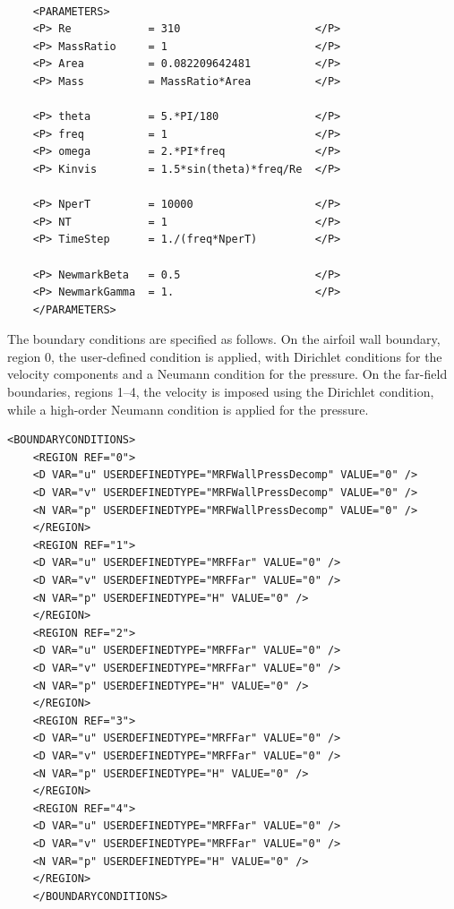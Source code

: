 \begin{lstlisting}[style=XMLStyle]
	
	<PARAMETERS>
	<P> Re            = 310                     </P>
	<P> MassRatio     = 1                       </P>
	<P> Area          = 0.082209642481          </P>
	<P> Mass          = MassRatio*Area          </P>
	
	<P> theta         = 5.*PI/180               </P>
	<P> freq          = 1                       </P>
	<P> omega         = 2.*PI*freq              </P>
	<P> Kinvis        = 1.5*sin(theta)*freq/Re  </P>
	
	<P> NperT         = 10000                   </P>
	<P> NT            = 1                       </P>
	<P> TimeStep      = 1./(freq*NperT)         </P>
	
	<P> NewmarkBeta   = 0.5                     </P>
	<P> NewmarkGamma  = 1.                      </P>
	</PARAMETERS>
\end{lstlisting}

The boundary conditions are specified as follows. On the airfoil wall boundary, region 0, the  user-defined condition is applied, with Dirichlet conditions for the velocity components and a Neumann condition for the pressure. On the far-field boundaries, regions 1--4, the velocity is imposed using the  Dirichlet condition, while a high-order Neumann condition is applied for the pressure.

\begin{lstlisting}[style=XMLStyle]
	<BOUNDARYCONDITIONS>
	<REGION REF="0">
	<D VAR="u" USERDEFINEDTYPE="MRFWallPressDecomp" VALUE="0" />
	<D VAR="v" USERDEFINEDTYPE="MRFWallPressDecomp" VALUE="0" />
	<N VAR="p" USERDEFINEDTYPE="MRFWallPressDecomp" VALUE="0" />
	</REGION>
	<REGION REF="1">
	<D VAR="u" USERDEFINEDTYPE="MRFFar" VALUE="0" />
	<D VAR="v" USERDEFINEDTYPE="MRFFar" VALUE="0" />
	<N VAR="p" USERDEFINEDTYPE="H" VALUE="0" />
	</REGION>
	<REGION REF="2">
	<D VAR="u" USERDEFINEDTYPE="MRFFar" VALUE="0" />
	<D VAR="v" USERDEFINEDTYPE="MRFFar" VALUE="0" />
	<N VAR="p" USERDEFINEDTYPE="H" VALUE="0" />
	</REGION>
	<REGION REF="3">
	<D VAR="u" USERDEFINEDTYPE="MRFFar" VALUE="0" />
	<D VAR="v" USERDEFINEDTYPE="MRFFar" VALUE="0" />
	<N VAR="p" USERDEFINEDTYPE="H" VALUE="0" />
	</REGION>
	<REGION REF="4">
	<D VAR="u" USERDEFINEDTYPE="MRFFar" VALUE="0" />
	<D VAR="v" USERDEFINEDTYPE="MRFFar" VALUE="0" />
	<N VAR="p" USERDEFINEDTYPE="H" VALUE="0" />
	</REGION>
	</BOUNDARYCONDITIONS>
\end{lstlisting}

